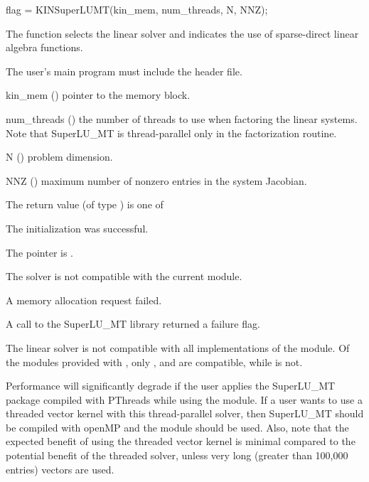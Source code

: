 {
  flag = KINSuperLUMT(kin\_mem, num\_threads, N, NNZ);
}
{
  The function  selects the {\kinsuperlumt} linear solver and indicates
  the use of sparse-direct linear algebra functions.

  The user's main program must include the  header file.
}
{
  \begin{args}
  \item[kin\_mem] ()
    pointer to the {\kinsol} memory block.
  \item[num\_threads] ()
    the number of threads to use when factoring the linear systems.  
    Note that SuperLU\_MT is thread-parallel only in the factorization routine.
  \item[N] ()
    problem dimension.
  \item[NNZ] ()
    maximum number of nonzero entries in the system Jacobian.
  \end{args}
}
{
  The return value  (of type ) is one of
  \begin{args}
  \item[\Id{KINSLS\_SUCCESS}] 
    The {\kinsuperlumt} initialization was successful.
  \item[\Id{KINSLS\_MEM\_NULL}]
    The  pointer is .
  \item[\Id{KINSLS\_ILL\_INPUT}]
    The {\kinsuperlumt} solver is not compatible with the current {\nvector} module.
  \item[\Id{KINSLS\_MEM\_FAIL}]
    A memory allocation request failed.
  \item[\Id{KINSLS\_PACKAGE\_FAIL}]
    A call to the SuperLU\_MT library returned a failure flag.
  \end{args}
}
{
  The {\kinsuperlumt} linear solver is not compatible with all
  implementations of the {\nvector} module.  Of the {\nvector} modules
  provided with {\sundials}, only {\nvecs}, {\nvecopenmp} and
  {\nvecpthreads} are compatible, while {\nvecp} is not.
  
  {\warn}Performance will significantly degrade if the user applies the SuperLU\_MT
  package compiled with PThreads while using the {\nvecopenmp} module.
  If a user wants to use a threaded vector kernel with this thread-parallel
  solver, then SuperLU\_MT should be compiled with openMP and the {\nvecopenmp}
  module should be used.  Also, note that the expected benefit of using the threaded
  vector kernel is minimal compared to the potential benefit of the threaded solver,
  unless very long (greater than 100,000 entries) vectors are used.
}
